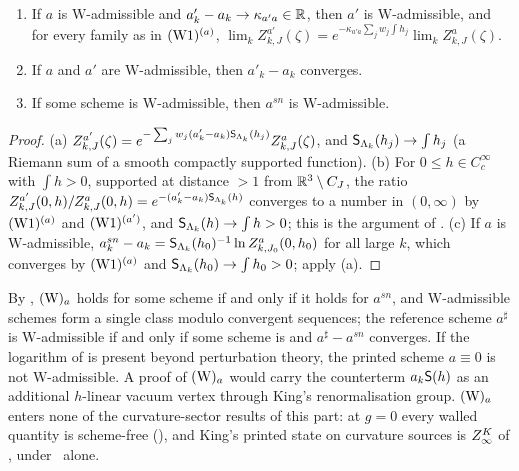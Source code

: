 \begin{lemma}\label{rot:lem:schemes}
\begin{enumerate}[label=\textup{(\alph*)},leftmargin=*]
\item If $a$ is $\mathrm W$-admissible and $a'_k-a_k\to\kappa_{a'a}\in\mathbb R$, then $a'$ is $\mathrm W$-admissible, and for every family as in $(\mathrm{W1})^{(a)}$, $\lim_kZ^{a'}_{k,J}(\zeta)=e^{-\kappa_{a'a}\sum_jw_j\int h_j}\lim_kZ^a_{k,J}(\zeta)$.
\item If $a$ and $a'$ are $\mathrm W$-admissible, then $a'_k-a_k$ converges.
\item If some scheme is $\mathrm W$-admissible, then $a^{sn}$ is $\mathrm W$-admissible.
\end{enumerate}
\end{lemma}

\begin{proof}
(a) $Z^{a'}_{k,J}(\zeta)=e^{-\sum_jw_j(a'_k-a_k)\mathsf S_{\Lambda_k}(h_j)}Z^a_{k,J}(\zeta)$, and $\mathsf S_{\Lambda_k}(h_j)\to\int h_j$ (a Riemann sum of a smooth compactly supported function).
(b) For $0\le h\in C^\infty_c$ with $\int h>0$, supported at distance $>1$ from $\mathbb R^3\setminus C_J$, the ratio $Z^{a'}_{k,J}(0,h)/Z^a_{k,J}(0,h)=e^{-(a'_k-a_k)\mathsf S_{\Lambda_k}(h)}$ converges to a number in $(0,\infty)$ by $(\mathrm{W1})^{(a)}$ and $(\mathrm{W1})^{(a')}$, and $\mathsf S_{\Lambda_k}(h)\to\int h>0$; this is the argument of .
(c) If $a$ is $\mathrm W$-admissible, $a^{sn}_k-a_k=\mathsf S_{\Lambda_k}(h_0)^{-1}\ln Z^a_{k,J_0}(0,h_0)$ for all large $k$, which converges by $(\mathrm{W1})^{(a)}$ and $\mathsf S_{\Lambda_k}(h_0)\to\int h_0>0$; apply (a).
\end{proof}

\begin{remark}\label{rot:rem:schemes}
By , $(\mathrm W)_{a}$ holds for some scheme if and only if it holds for $a^{sn}$, and $\mathrm W$-admissible schemes form a single class modulo convergent sequences; the reference scheme $a^\sharp$ is $\mathrm W$-admissible if and only if some scheme is and $a^\sharp-a^{sn}$ converges. If the logarithm of  is present beyond perturbation theory, the printed scheme $a\equiv0$ is not $\mathrm W$-admissible. A proof of $(\mathrm W)_{a}$ would carry the counterterm $a_k\mathsf S(h)$ as an additional $h$-linear vacuum vertex through King's renormalisation group. $(\mathrm W)_{a}$ enters none of the curvature-sector results of this part: at $g=0$ every walled quantity is scheme-free (), and King's printed state on curvature sources is $Z^{K}_{\infty}$ of , under \EC\ alone.
\end{remark}

